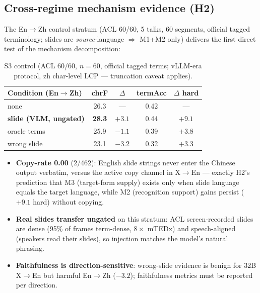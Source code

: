\subsection{Cross-regime mechanism evidence (H2)}
\label{sec:mechanism}

The En$\rightarrow$Zh control stratum (ACL 60/60, 5 talks, 60 segments,
official tagged terminology; slides are \emph{source}-language $\Rightarrow$
M1+M2 only) delivers the first direct test of the mechanism decomposition:

\begin{table}[t]
\centering
\small
\begin{tabular}{lcccc}
\toprule
Condition (En$\rightarrow$Zh) & chrF & $\Delta$ & termAcc & $\Delta$ hard \\
\midrule
none              & 26.3 & ---    & 0.42 & ---    \\
\textbf{slide (VLM, ungated)} & \textbf{28.3} & $+3.1$ & 0.44 & $+9.1$ \\
oracle terms      & 25.9 & $-1.1$ & 0.39 & $+3.8$ \\
wrong slide       & 23.1 & $-3.2$ & 0.32 & $+3.3$ \\
\bottomrule
\end{tabular}
\caption{S3 control (ACL 60/60, $n{=}60$, official tagged terms; vLLM-era
protocol, zh char-level LCP --- truncation caveat applies).}
\label{tab:s3}
\end{table}

\begin{itemize}[leftmargin=*]
\item \textbf{Copy-rate 0.00} (2/462): English slide strings never enter the
  Chinese output verbatim, versus the active copy channel in X$\rightarrow$En
  --- exactly H2's prediction that M3 (target-form supply) exists only when
  slide language equals the target language, while M2 (recognition support)
  gains persist ($+9.1$ hard) without copying.
\item \textbf{Real slides transfer ungated} on this stratum: ACL screen-recorded
  slides are dense (95\% of frames term-dense, $8\times$ mTEDx) and
  speech-aligned (speakers read their slides), so injection matches the
  model's natural phrasing.
\item \textbf{Faithfulness is direction-sensitive}: wrong-slide evidence is
  benign for 32B X$\rightarrow$En but harmful En$\rightarrow$Zh ($-3.2$);
  faithfulness metrics must be reported per direction.
\end{itemize}


